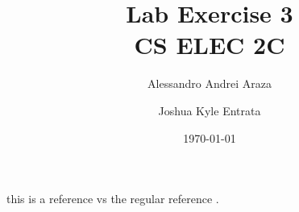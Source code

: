 

\title{{\Huge Lab Exercise 3}\\{\small CS ELEC 2C}}
\author{Alessandro Andrei Araza \and Joshua Kyle Entrata}
\date{\today}



    \maketitle

    \begin{abstract}
    \end{abstract}

    \begin{multicols}{2}
        
        
        
        
        
    \end{multicols}

    \cite{mitlohner_characteristics_2016}

    this is a reference \citep{gaines_emotional_1983} vs the regular reference \cite{gaines_emotional_1983}.
    \nocite{*}

    \newpage
    


